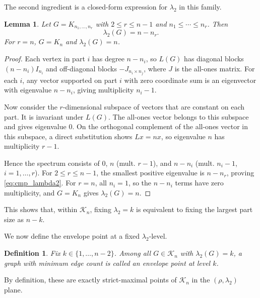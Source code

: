 \documentclass[letterpaper, 10 pt, conference]{ieeeconf}  %
\newtheorem{lemma}{Lemma}
\newtheorem{definition}{Definition}
\newcommand{\1}{\mathbf{1}}
\newcommand{\0}{\mathbf{0}}
\begin{document}
The second ingredient is a closed-form expression for \(\lambda_2\) in this family.
\begin{lemma}\label{lem:cmp_lambda2_formula}
Let \(G=K_{n_1,\dots,n_r}\) with \(2\le r\le n-1\) and \(n_1\le\cdots\le n_r\).
Then
\begin{equation}
\lambda_2(G)=n-n_r.
\label{eq:cmp_lambda2}
\end{equation}
For \(r=n\), \(G=K_n\) and \(\lambda_2(G)=n\).
\end{lemma}
\begin{proof}
Each vertex in part \(i\) has degree \(n-n_i\), so \(L(G)\) has diagonal blocks \((n-n_i)I_{n_i}\) and off-diagonal blocks \(-J_{n_i\times n_j}\), where \(J\) is the all-ones matrix.
For each \(i\), any vector supported on part \(i\) with zero coordinate sum is an eigenvector with eigenvalue \(n-n_i\), giving multiplicity \(n_i-1\).

Now consider the \(r\)-dimensional subspace of vectors that are constant on each part. It is invariant under \(L(G)\). The all-ones vector belongs to this subspace and gives eigenvalue \(0\). On the orthogonal complement of the all-ones vector in this subspace, a direct substitution shows \(Lx=nx\), so eigenvalue \(n\) has multiplicity \(r-1\).

Hence the spectrum consists of \(0\), \(n\) (mult. \(r-1\)), and \(n-n_i\) (mult. \(n_i-1\), \(i=1,\dots,r\)).
For \(2\le r\le n-1\), the smallest positive eigenvalue is \(n-n_r\), proving \eqref{eq:cmp_lambda2}.
For \(r=n\), all \(n_i=1\), so the \(n-n_i\) terms have zero multiplicity, and \(G=K_n\) gives \(\lambda_2(G)=n\).
\end{proof}
This shows that, within \(\mathcal K_n\), fixing \(\lambda_2=k\) is equivalent to fixing the largest part size as \(n-k\).

We now define the envelope point at a fixed \(\lambda_2\)-level.
\begin{definition}
Fix \(k\in\{1,\dots,n-2\}\).  
Among all \(G\in\mathcal K_n\) with \(\lambda_2(G)=k\), a graph with minimum edge count is called an envelope point at level \(k\).
\end{definition}
By definition, these are exactly strict-maximal points of \(\mathcal K_n\) in the \((\rho,\lambda_2)\) plane.
\end{document}
